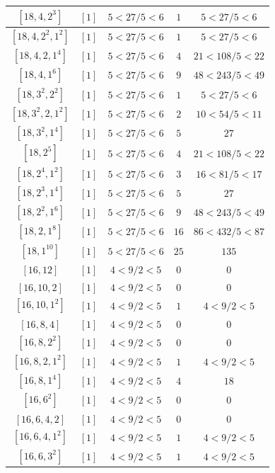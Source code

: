 \documentclass{article}%
\begin{document}
\begin{center}
\begin{longtable}{||c|c|c|c|c||}
$[18, 4, 2^{3}]$ & $[1]$ & $5 < 27/5 < 6$ & $1$ & $5 < 27/5 < 6$ \\ \hline 
$[18, 4, 2^{2}, 1^{2}]$ & $[1]$ & $5 < 27/5 < 6$ & $1$ & $5 < 27/5 < 6$ \\ \hline 
$[18, 4, 2, 1^{4}]$ & $[1]$ & $5 < 27/5 < 6$ & $4$ & $21 < 108/5 < 22$ \\ \hline 
$[18, 4, 1^{6}]$ & $[1]$ & $5 < 27/5 < 6$ & $9$ & $48 < 243/5 < 49$ \\ \hline 
$[18, 3^{2}, 2^{2}]$ & $[1]$ & $5 < 27/5 < 6$ & $1$ & $5 < 27/5 < 6$ \\ \hline 
$[18, 3^{2}, 2, 1^{2}]$ & $[1]$ & $5 < 27/5 < 6$ & $2$ & $10 < 54/5 < 11$ \\ \hline 
$[18, 3^{2}, 1^{4}]$ & $[1]$ & $5 < 27/5 < 6$ & $5$ & $27$ \\ \hline 
$[18, 2^{5}]$ & $[1]$ & $5 < 27/5 < 6$ & $4$ & $21 < 108/5 < 22$ \\ \hline 
$[18, 2^{4}, 1^{2}]$ & $[1]$ & $5 < 27/5 < 6$ & $3$ & $16 < 81/5 < 17$ \\ \hline 
$[18, 2^{3}, 1^{4}]$ & $[1]$ & $5 < 27/5 < 6$ & $5$ & $27$ \\ \hline 
$[18, 2^{2}, 1^{6}]$ & $[1]$ & $5 < 27/5 < 6$ & $9$ & $48 < 243/5 < 49$ \\ \hline 
$[18, 2, 1^{8}]$ & $[1]$ & $5 < 27/5 < 6$ & $16$ & $86 < 432/5 < 87$ \\ \hline 
$[18, 1^{10}]$ & $[1]$ & $5 < 27/5 < 6$ & $25$ & $135$ \\ \hline 
$[16, 12]$ & $[1]$ & $4 < 9/2 < 5$ & $0$ & $0$ \\ \hline 
$[16, 10, 2]$ & $[1]$ & $4 < 9/2 < 5$ & $0$ & $0$ \\ \hline 
$[16, 10, 1^{2}]$ & $[1]$ & $4 < 9/2 < 5$ & $1$ & $4 < 9/2 < 5$ \\ \hline 
$[16, 8, 4]$ & $[1]$ & $4 < 9/2 < 5$ & $0$ & $0$ \\ \hline 
$[16, 8, 2^{2}]$ & $[1]$ & $4 < 9/2 < 5$ & $0$ & $0$ \\ \hline 
$[16, 8, 2, 1^{2}]$ & $[1]$ & $4 < 9/2 < 5$ & $1$ & $4 < 9/2 < 5$ \\ \hline 
$[16, 8, 1^{4}]$ & $[1]$ & $4 < 9/2 < 5$ & $4$ & $18$ \\ \hline 
$[16, 6^{2}]$ & $[1]$ & $4 < 9/2 < 5$ & $0$ & $0$ \\ \hline 
$[16, 6, 4, 2]$ & $[1]$ & $4 < 9/2 < 5$ & $0$ & $0$ \\ \hline 
$[16, 6, 4, 1^{2}]$ & $[1]$ & $4 < 9/2 < 5$ & $1$ & $4 < 9/2 < 5$ \\ \hline 
$[16, 6, 3^{2}]$ & $[1]$ & $4 < 9/2 < 5$ & $1$ & $4 < 9/2 < 5$ \\ \hline 

\end{longtable}
\end{center}
\end{document}
